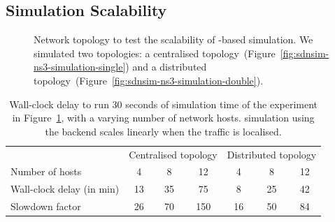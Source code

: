 \subsection{ Simulation Scalability} \label{sec:sdnsim-ns3-perf}

\begin{figure}[ht]
\caption[ scalability evaluation topology]{Network topology to test the
scalability of -based simulation. We simulated two topologies: a
centralised topology~(Figure~\ref{fig:sdnsim-ns3-simulation-single}) and a
distributed topology~(Figure~\ref{fig:sdnsim-ns3-simulation-double}).}
\label{fig:sdnsim-ns3-simulation}
\end{figure}

\begin{table}
\begin{center}
\begin{tabular}{|l|c|c|c|c|c|c|} \hline
&\multicolumn{3}{|c|}{Centralised topology} & \multicolumn{3}{|c|}{Distributed
  topology} \\
\cline{2-7}
Number of hosts & 4 & 8 & 12 & 4 & 8 & 12 \\
\hline 
Wall-clock delay (in min) & 13 & 35 & 75 & 8 & 25 & 42 \\
\hline
Slowdown factor & 26 & 70 & 150 & 16 & 50 & 84 \\
\hline 
\end{tabular}
\end{center}
\caption[Wall-clock delay to run 30 seconds of simulation time.]{Wall-clock
delay to run 30 seconds of simulation time of the experiment in
Figure~\ref{fig:sdnsim-ns3-simulation}, with a varying number of network hosts.
\sdnsim simulation using the  backend scales
linearly when the traffic is localised.}
\label{tbl:sdnsim-ns3-simulation-results}
\end{table}


